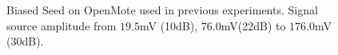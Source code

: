 \begin{figure}[!t]
\centering
{}
\hfil
{}
\caption{Biased Seed on OpenMote used in previous experiments. Signal source amplitude from $19.5$mV (10dB), $76.0$mV(22dB) to $176.0$mV (30dB).}
\label{StronglyBiased}
\end{figure}


